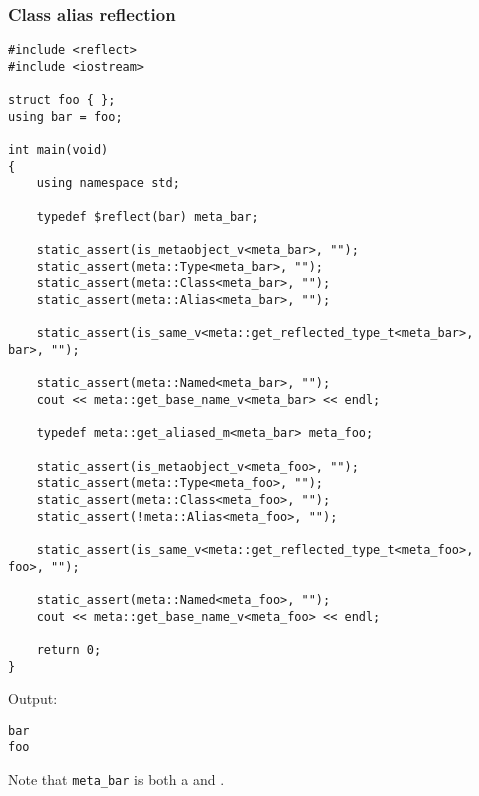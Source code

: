 \subsubsection{Class alias reflection}

\begin{verbatim}
#include <reflect>
#include <iostream>

struct foo { };
using bar = foo;

int main(void)
{
	using namespace std;

	typedef $reflect(bar) meta_bar;

	static_assert(is_metaobject_v<meta_bar>, "");
	static_assert(meta::Type<meta_bar>, "");
	static_assert(meta::Class<meta_bar>, "");
	static_assert(meta::Alias<meta_bar>, "");

	static_assert(is_same_v<meta::get_reflected_type_t<meta_bar>, bar>, "");

	static_assert(meta::Named<meta_bar>, "");
	cout << meta::get_base_name_v<meta_bar> << endl;

	typedef meta::get_aliased_m<meta_bar> meta_foo;

	static_assert(is_metaobject_v<meta_foo>, "");
	static_assert(meta::Type<meta_foo>, "");
	static_assert(meta::Class<meta_foo>, "");
	static_assert(!meta::Alias<meta_foo>, "");

	static_assert(is_same_v<meta::get_reflected_type_t<meta_foo>, foo>, "");

	static_assert(meta::Named<meta_foo>, "");
	cout << meta::get_base_name_v<meta_foo> << endl;

	return 0;
}
\end{verbatim}

Output:

\begin{verbatim}
bar
foo
\end{verbatim}

Note that \texttt{meta\_bar} is both a  and .

